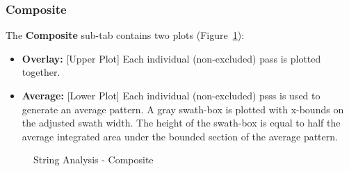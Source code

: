 \documentclass[10pt,letterpaper,titlepage]{article}
\begin{document}
    \subsubsection{Composite}
    The \textbf{Composite} sub-tab contains two plots (Figure~\ref{fig:string_composite}):
    \begin{itemize}
        \item \textbf{Overlay:} [Upper Plot] Each individual (non-excluded) pass is plotted together. 
        \item \textbf{Average:} [Lower Plot] Each individual (non-excluded) psss is used to generate an average pattern. A gray swath-box is plotted with x-bounds on the adjusted swath width. The height of the swath-box is equal to half the average integrated area under the bounded section of the average pattern.
    \end{itemize}
    \begin{figure}[hb]
        \centering
        \caption{String Analysis - Composite}
        \label{fig:string_composite}
    \end{figure}
    \newpage
\end{document}
